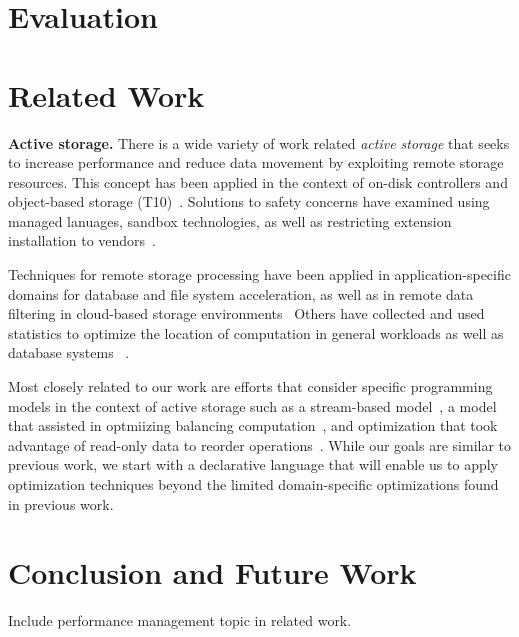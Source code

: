 \documentclass[10pt,twocolumn]{article}
\begin{document}
\section{Evaluation}

\section{Related Work}

{\bf Active storage.}
There is a wide variety of work related \emph{active storage} that seeks to
increase performance and reduce data movement by exploiting remote storage
resources. This concept has been applied in the context of on-disk
controllers and object-based storage
(T10)~\cite{riedel:vldb98,du:nwesp05,xie:msst11}.  Solutions to safety
concerns have examined using managed lanuages, sandbox technologies, as well
as restricting extension installation to
vendors~\cite{john:hiperio08,xie:msst11,runde:msst12}.

Techniques for remote storage processing have been applied in
application-specific domains for database and file system acceleration, as
well as in remote data filtering in cloud-based storage
environments~\cite{uysal:hpca00,chiu:iccs03,lim:msst08,gkantsidis:nsdi13}
Others have collected and used statistics to optimize the location of
computation in general workloads as well as database systems
~\cite{chen:cluster12,chen:icpp12,qiao:icde08}.

Most closely related to our work are efforts that consider specific
programming models in the context of active storage such as a stream-based
model~\cite{acharya:asplos98}, a model that assisted in optmiizing balancing
computation~\cite{wickremesinghe:hpdc022}, and optimization that took
advantage of read-only data to reorder operations~\cite{huston:fast04}.
While our goals are similar to previous work, we start with a declarative
language that will enable us to apply optimization techniques beyond
the limited domain-specific optimizations found in previous work.

\section{Conclusion and Future Work}

Include performance management topic in related work.
\end{document}
